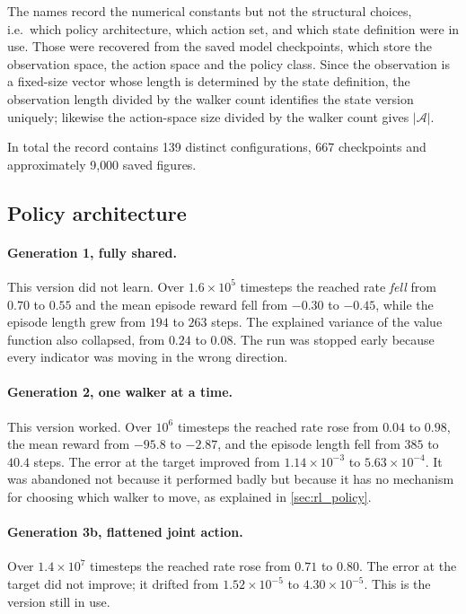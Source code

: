 The names record the numerical constants but not the structural choices, i.e.\
which policy architecture, which action set, and which state definition were
in use. Those were recovered from the saved model checkpoints, which store the
observation space, the action space and the policy class. Since the observation
is a fixed-size vector whose length is determined by the state definition, the
observation length divided by the walker count identifies the state version
uniquely; likewise the action-space size divided by the walker count gives
$|\mathcal{A}|$.

In total the record contains 139 distinct configurations, 667 checkpoints and
approximately 9{,}000 saved figures.

\subsection{Policy architecture}
\label{sec:rl_record_policy}

\paragraph{Generation 1, fully shared.}
This version did not learn. Over $1.6\times10^5$ timesteps the reached rate
\emph{fell} from $0.70$ to $0.55$ and the mean episode reward fell from $-0.30$
to $-0.45$, while the episode length grew from $194$ to $263$ steps. The
explained variance of the value function also collapsed, from $0.24$ to $0.08$.
The run was stopped early because every indicator was moving in the wrong
direction.

\paragraph{Generation 2, one walker at a time.}
This version worked. Over $10^6$ timesteps the reached rate rose from $0.04$ to
$0.98$, the mean reward from $-95.8$ to $-2.87$, and the episode length fell
from $385$ to $40.4$ steps. The error at the target improved from
$1.14\times10^{-3}$ to $5.63\times10^{-4}$. It was abandoned not because it
performed badly but because it has no mechanism for choosing which walker to
move, as explained in \cref{sec:rl_policy}.

\paragraph{Generation 3b, flattened joint action.}
Over $1.4\times10^7$ timesteps the reached rate rose from $0.71$ to $0.80$.
The error at the target did not improve; it drifted from $1.52\times10^{-5}$ to
$4.30\times10^{-5}$. This is the version still in use.

